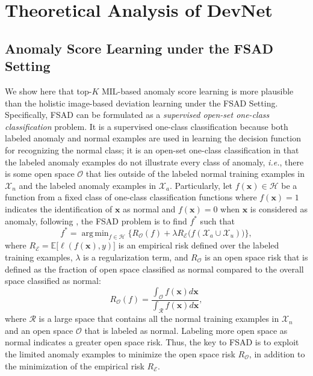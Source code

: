 \documentclass[10pt,journal,compsoc]{IEEEtran}
\newcommand{\ie}{\textit{i.e.}}
\DeclareMathOperator*{\argmin}{arg\,min}
\newcommand{\xvec}{{\mathbf{x}}}
\begin{document}
\section{Theoretical Analysis of DevNet}

\subsection{Anomaly Score Learning under the FSAD Setting}\label{subsec:fsad_analysis}

We show here that top-$K$ MIL-based anomaly score learning is more plausible than the holistic image-based deviation learning under the FSAD Setting. Specifically, FSAD can be formulated as a \textit{supervised open-set one-class classification} problem. It is a supervised one-class classification because both labeled anomaly and normal examples are used in learning the decision function for recognizing the normal class; it is an open-set one-class classification in that the labeled anomaly examples do not illustrate every class of anomaly, \ie, there is some open space $\mathcal{O}$ that lies outside of the labeled normal training examples in $\mathcal{X}_n$ and the labeled anomaly examples in $\mathcal{X}_a$. Particularly, let $f(\xvec) \in \mathcal{H}$ be a function from a fixed class of one-class classification functions where $f(\xvec)=1$ indicates the identification of $\xvec$ as normal and $f(\xvec)=0$ when $\xvec$ is considered as anomaly, following \cite{scheirer2012toward}, the FSAD problem is to find $f^*$ such that
\begin{equation}\label{eqn:bothrisk}
    f^* = \argmin_{f \in \mathcal{H}}\{R_{\mathcal{O}}(f) + \lambda R_{\mathcal{E}}\big(f(\mathcal{X}_a \cup \mathcal{X}_u)\big) \},
\end{equation}
where $R_{\mathcal{E}}=\mathbb{E}\big[\ell(f(\xvec),y)\big]$ is an empirical risk defined over the labeled training examples, $\lambda$ is a regularization term, and $R_{\mathcal{O}}$ is an open space risk that is defined as the fraction of open space classified as normal compared to the overall space classified as normal:
\begin{equation}\label{eqn:openrisk}
    R_{\mathcal{O}}(f)=\frac{\int_{\mathcal{O}}f(\xvec)d\xvec}{\int_{\mathcal{R}}f(\xvec)d\xvec},
\end{equation}
where $\mathcal{R}$ is a large space that contains all the normal training examples in $\mathcal{X}_n$ and an open space $\mathcal{O}$ that is labeled as normal. Labeling more open space as normal indicates a greater open space risk. Thus, the key to FSAD is to exploit the limited anomaly examples to minimize the open space risk $R_{\mathcal{O}}$, in addition to the minimization of the empirical risk $R_{\mathcal{E}}$.
\end{document}
